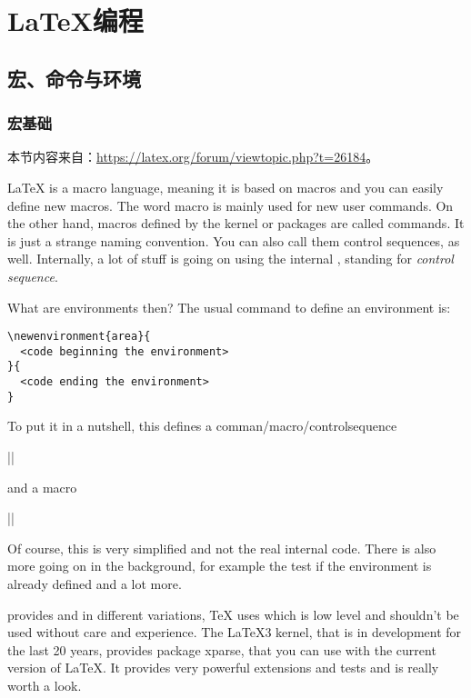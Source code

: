 \chapter{{\LaTeX 编程}}

\section{宏、命令与环境}

\subsection{宏基础}

本节内容来自：\url{https://latex.org/forum/viewtopic.php?t=26184}。

{\LaTeX} is a macro language, meaning it is based on macros and you can easily define new macros. The word macro is mainly used for new user commands. On the other hand, macros defined by the kernel or packages are called commands. It is just a strange naming convention.
You can also call them control sequences, as well. Internally, a lot of stuff is going on using the internal ,  standing for \textit{control sequence}.

What are environments then? The usual command to define an environment is:

\begin{verbatim}
\newenvironment{area}{
  <code beginning the environment>
}{
  <code ending the environment>
}
\end{verbatim}

To put it in a nutshell, this defines a comman/macro/controlsequence 

|\newcommand{\area}{<code beginning the environment>}|

and a macro 

|\newcommand{\endmacro}{<code to end the environment>}|

Of course, this is very simplified and not the real internal code. There is also more going on in the background, for example the test if the environment is already defined and a lot more.

{\LaTeXe} provides  and  in different variations, 
{\TeX} uses  which is low level and shouldn't be used without care and experience.
The {\LaTeX3} kernel, that is in development for the last 20 years, provides package xparse, 
that you can use with the current version of {\LaTeX}. It provides very powerful extensions and tests and is really worth a look.

